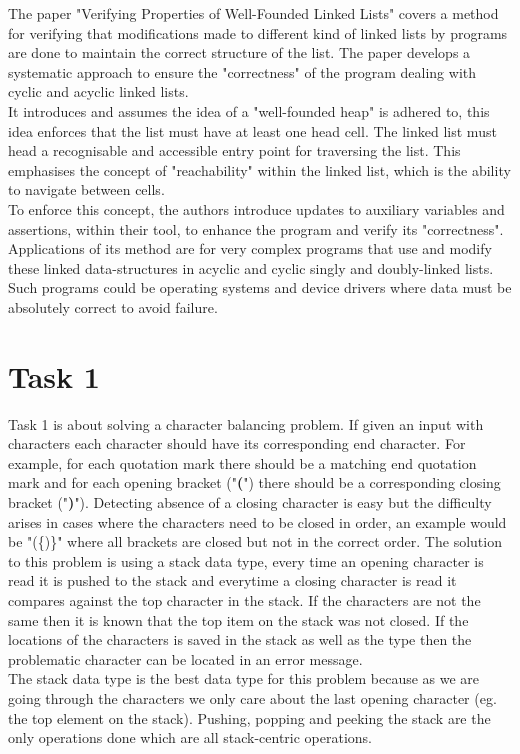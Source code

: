 \documentclass{article}
\begin{document}
The paper "Verifying Properties of Well-Founded Linked Lists" covers a method for verifying that modifications made to different kind of linked lists by programs are done to maintain the correct structure of the list.
The paper develops a systematic approach to ensure the "correctness" of the program dealing with cyclic and acyclic linked lists. \\
It introduces and assumes the idea of a "well-founded heap" is adhered to, this idea enforces that the list must have at least one head cell. The linked list must head a recognisable and accessible entry point for traversing the list. This emphasises the concept of "reachability" within the linked list, which is the ability to navigate between cells. \\
To enforce this concept, the authors introduce updates to auxiliary variables and assertions, within their tool, to enhance the program and verify its "correctness". Applications of its method are for very complex programs that use and modify these linked data-structures in acyclic and cyclic singly and doubly-linked lists. Such programs could be operating systems and device drivers where data must be absolutely correct to avoid failure. 

\section{Task 1}

Task 1 is about solving a character balancing problem. If given an input with characters each character should have its corresponding end character. For example, for each quotation mark there should be a matching end quotation mark and for each opening bracket ("\textbf{(}") there should be a corresponding closing bracket ("\textbf{)}"). Detecting absence of a closing character is easy but the difficulty arises in cases where the characters need to be closed in order, an example would be "(\{)\}" where all brackets are closed but not in the correct order. The solution to this problem is using a stack data type, every time an opening character is read it is pushed to the stack and everytime a closing character is read it compares against the top character in the stack. If the characters are not the same then it is known that the top item on the stack was not closed. If the locations of the characters is saved in the stack as well as the type then the problematic character can be located in an error message. \\

The stack data type is the best data type for this problem because as we are going through the characters we only care about the last opening character (eg. the top element on the stack). Pushing, popping and peeking the stack are the only operations done which are all stack-centric operations. 
\end{document}

